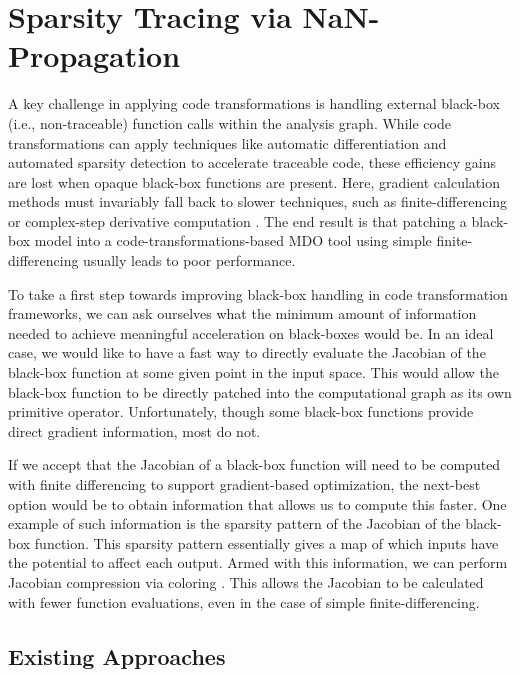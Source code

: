 \chapter{Sparsity Tracing via NaN-Propagation}
\label{sec:nan_propagation}

A key challenge in applying code transformations is handling external black-box (i.e., non-traceable) function calls within the analysis graph. While code transformations can apply techniques like automatic differentiation and automated sparsity detection to accelerate traceable code, these efficiency gains are lost when opaque black-box functions are present. Here, gradient calculation methods must invariably fall back to slower techniques, such as finite-differencing or complex-step derivative computation \cite{martins_complexstep_2003}. The end result is that patching a black-box model into a code-transformations-based MDO tool using simple finite-differencing usually leads to poor performance.

To take a first step towards improving black-box handling in code transformation frameworks, we can ask ourselves what the minimum amount of information needed to achieve meaningful acceleration on black-boxes would be. In an ideal case, we would like to have a fast way to directly evaluate the Jacobian of the black-box function at some given point in the input space. This would allow the black-box function to be directly patched into the computational graph as its own primitive operator. Unfortunately, though some black-box functions provide direct gradient information, most do not.

If we accept that the Jacobian of a black-box function will need to be computed with finite differencing to support gradient-based optimization, the next-best option would be to obtain information that allows us to compute this faster. One example of such information is the sparsity pattern of the Jacobian of the black-box function. This sparsity pattern essentially gives a map of which inputs have the potential to affect each output. Armed with this information, we can perform Jacobian compression via coloring \cite{gebremedhin_efficient_2009, gebremedhin_what_2005, martins_engineering_2021}. This allows the Jacobian to be calculated with fewer function evaluations, even in the case of simple finite-differencing.


\section{Existing Approaches}
\label{sec:nan-existing-methods}


